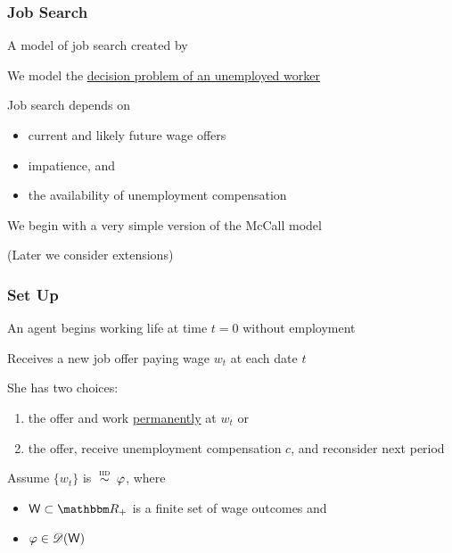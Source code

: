 \begin{frame}
    \frametitle{Job Search}

    A model of job search created by 
    \vspace{0.5em}

    We model the \underline{decision problem of an unemployed worker}

    \vspace{0.5em}
    Job search depends on
    \begin{itemize}
        \item current and likely future wage offers
    \vspace{0.5em}
        \item impatience, and
    \vspace{0.5em}
        \item the availability of unemployment compensation
    \end{itemize}

    \vspace{0.5em}
    We begin with a very simple version of the McCall model 

    \vspace{0.5em}
    (Later we consider extensions)

\end{frame}


\begin{frame}
    \frametitle{Set Up}
    
    An agent begins working life at time $t=0$ without employment  

            \vspace{0.5em}
    Receives a new job offer paying wage $w_t$ at each date $t$  
            \vspace{0.5em}

    She has two choices:
    \begin{enumerate}
        \item {} the offer and work \underline{permanently} at $w_t$ or
            \vspace{0.5em}
        \item {} the offer, receive unemployment compensation $c$, and reconsider next period
    \end{enumerate}

            \vspace{0.5em}
    Assume $\{w_t\}$ is $\stackrel{\textrm{ {\sc iid }}} {\sim} \varphi$, where
    \begin{itemize}
        \item $\Wsf \subset \RR_+$ is a finite set of wage outcomes and
            \vspace{0.5em}
        \item $\varphi \in \mathscr D(\mathsf W)$
    \end{itemize}

\end{frame}



